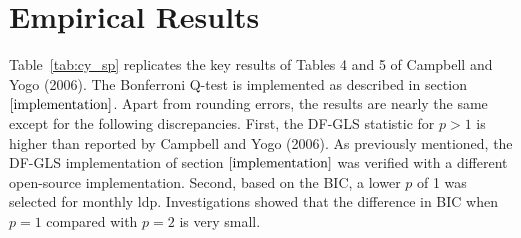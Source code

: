 \documentclass{article}
\begin{document}
\section{Empirical Results}

Table~\vref{tab:cy_sp} replicates the key results of Tables 4 and 5 of Campbell and Yogo (2006). The Bonferroni Q-test is implemented as described in section $\ref{implementation}$. Apart from rounding errors, the results are nearly the same except for the following discrepancies. First, the DF-GLS statistic for $p>1$ is higher than reported by Campbell and Yogo (2006).  As previously mentioned, the DF-GLS implementation of section $\ref{implementation}$ was verified with a different open-source implementation. Second, based on the BIC, a lower $p$ of 1 was selected for monthly ldp. Investigations showed that the difference in BIC when $p=1$ compared with $p=2$ is very small. 
\end{document}

